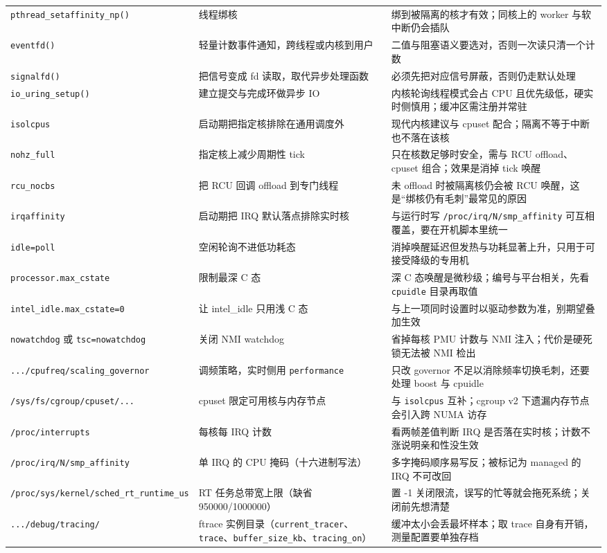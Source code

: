 \documentclass[12pt,a4paper,fontset=fandol]{ctexbook}
\newcommand{\Fn}[1]{\texttt{#1()}}
\newcommand{\Tp}[1]{\texttt{#1}}
\newcommand{\Bk}{\discretionary{}{}{}}
\begin{document}
\begin{longtable}{>{\raggedright\arraybackslash\footnotesize}p{} >{\raggedright\arraybackslash\footnotesize}p{} >{\raggedright\arraybackslash\footnotesize}p{}}
\Fn{pthread\_{\Bk}setaffinity\_{\Bk}np} & 线程绑核 & 绑到被隔离的核才有效；同核上的 worker 与软中断仍会插队 \\
\Fn{eventfd} & 轻量计数事件通知，跨线程或内核到用户 & 二值与阻塞语义要选对，否则一次读只清一个计数 \\
\Fn{signalfd} & 把信号变成 fd 读取，取代异步处理函数 & 必须先把对应信号屏蔽，否则仍走默认处理 \\
\Fn{io\_uring\_setup} & 建立提交与完成环做异步 IO & 内核轮询线程模式会占 CPU 且优先级低，硬实时侧慎用；缓冲区需注册并常驻 \\
\Tp{isolcpus} & 启动期把指定核排除在通用调度外 & 现代内核建议与 cpuset 配合；隔离不等于中断也不落在该核 \\
\Tp{nohz\_full} & 指定核上减少周期性 tick & 只在核数足够时安全，需与 RCU offload、cpuset 组合；效果是消掉 tick 唤醒 \\
\Tp{rcu\_nocbs} & 把 RCU 回调 offload 到专门线程 & 未 offload 时被隔离核仍会被 RCU 唤醒，这是``绑核仍有毛刺''最常见的原因 \\
\Tp{irqaffinity} & 启动期把 IRQ 默认落点排除实时核 & 与运行时写 \Tp{/proc/irq/N/smp\_affinity} 可互相覆盖，要在开机脚本里统一 \\
\Tp{idle=poll} & 空闲轮询不进低功耗态 & 消掉唤醒延迟但发热与功耗显著上升，只用于可接受降级的专用机 \\
\Tp{processor.max\_cstate} & 限制最深 C 态 & 深 C 态唤醒是微秒级；编号与平台相关，先看 \Tp{cpuidle} 目录再取值 \\
\Tp{intel\_idle.max\_cstate=0} & 让 intel\_idle 只用浅 C 态 & 与上一项同时设置时以驱动参数为准，别期望叠加生效 \\
\Tp{nowatchdog} 或 \Tp{tsc=nowatchdog} & 关闭 NMI watchdog & 省掉每核 PMU 计数与 NMI 注入；代价是硬死锁无法被 NMI 检出 \\
\Tp{.../{\Bk}cpufreq/{\Bk}scaling\_{\Bk}governor} & 调频策略，实时侧用 \Tp{performance} & 只改 governor 不足以消除频率切换毛刺，还要处理 boost 与 cpuidle \\
\Tp{/{\Bk}sys/{\Bk}fs/{\Bk}cgroup/{\Bk}cpuset/{\Bk}...} & cpuset 限定可用核与内存节点 & 与 \Tp{isolcpus} 互补；cgroup v2 下遗漏内存节点会引入跨 NUMA 访存 \\
\Tp{/proc/interrupts} & 每核每 IRQ 计数 & 看两帧差值判断 IRQ 是否落在实时核；计数不涨说明亲和性没生效 \\
\Tp{/{\Bk}proc/{\Bk}irq/{\Bk}N/{\Bk}smp\_{\Bk}affinity} & 单 IRQ 的 CPU 掩码（十六进制写法） & 多字掩码顺序易写反；被标记为 managed 的 IRQ 不可改回 \\
\Tp{/{\Bk}proc/{\Bk}sys/{\Bk}kernel/{\Bk}sched\_{\Bk}rt\_{\Bk}runtime\_{\Bk}us} & RT 任务总带宽上限（缺省 950000/1000000） & 置 -1 关闭限流，误写的忙等就会拖死系统；关闭前先想清楚 \\
\Tp{.../debug/tracing/} & ftrace 实例目录（\Tp{current\_tracer}、\Tp{trace}、\Tp{buffer\_size\_kb}、\Tp{tracing\_on}） & 缓冲太小会丢最坏样本；取 trace 自身有开销，测量配置要单独存档 \\
\end{longtable}
\end{document}
